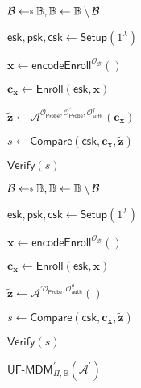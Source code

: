\begin{figure}[h]
\centering
\vspace*{-\multicolsep}
\begin{multicols}{2}

	\begin{minipage}[t]{0.9\linewidth}
	\begin{algorithm}[H]
	\caption{${\textsf{UF-MDM}}_{\Pi, \mathbb{B}}(\mathcal{A})$}
	\label{alg:uf-mdm_game}
	\begin{algorithmic}[1]
		\State $\mathcal{B} \getsdollar \mathbb{B}, \mathbb{B} \gets \mathbb{B} \setminus \mathcal{B}$

		\State $\textsf{esk}, \textsf{psk}, \textsf{csk} \gets \textsf{Setup}(1^\lambda)$

		\State $\mathbf{x} \gets \textsf{encodeEnroll}^{\mathcal{O}_{\mathcal{B}}}()$

		\State $\mathbf{c_x} \gets \textsf{Enroll}(\textsf{esk}, \mathbf{x})$

		\State ${\mathbf{\tilde{z}}} \gets \mathcal{A}^{ \mathcal{O}_\textsf{Probe}, \mathcal{O}_\textsf{Probe}^\prime, \mathcal{O}_\textsf{auth}^q } ( \mathbf{c_x} )$

		\State $s \gets \textsf{Compare}( \textsf{csk}, \mathbf{c_x}, \mathbf{\tilde{z}} )$

		\State \Return $\textsf{Verify}(s)$
	\end{algorithmic}
	\end{algorithm}
	\end{minipage}

	\begin{minipage}[t]{0.9\linewidth}
	\begin{algorithm}[H]
	\caption{${\textsf{UF-MDM}}^\prime_{\Pi, \mathbb{B}}(\mathcal{A}^\prime)$}
	\label{alg:uf-mdm-prime_game}
	\begin{algorithmic}[1]
		\State $\mathcal{B} \getsdollar \mathbb{B}, \mathbb{B} \gets \mathbb{B} \setminus \mathcal{B}$

		\State $\textsf{esk}, \textsf{psk}, \textsf{csk} \gets \textsf{Setup}(1^\lambda)$

		\State $\mathbf{x} \gets \textsf{encodeEnroll}^{\mathcal{O}_{\mathcal{B}}}()$

		\State $\mathbf{c_x} \gets \textsf{Enroll}(\textsf{esk}, \mathbf{x})$

		\State ${\mathbf{\tilde{z}}} \gets \mathcal{A}^{\prime \mathcal{O}_\textsf{Probe}, \mathcal{O}_\textsf{auth}^q}()$

		\State $s \gets \textsf{Compare}( \textsf{csk}, \mathbf{c_x}, \mathbf{\tilde{z}} )$

		\State \Return $\textsf{Verify}(s)$
	\end{algorithmic}
	\end{algorithm}
	\end{minipage}

\end{multicols}
\label{fig:uf-mdm_game}
\end{figure}

